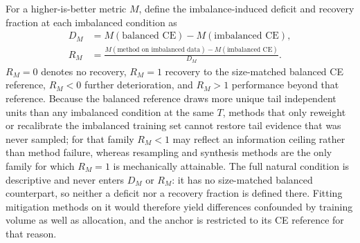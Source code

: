 \documentclass[11pt]{article}
\begin{document}
For a higher-is-better metric $M$, define the imbalance-induced deficit and recovery fraction at each imbalanced condition as
\begin{equation}
  \begin{aligned}
    D_M &= M(\text{balanced CE})-M(\text{imbalanced CE}),\\
    R_M &= \frac{M(\text{method on imbalanced data})
      -M(\text{imbalanced CE})}{D_M}.
  \end{aligned}
  \label{eq:recovery}
\end{equation}
$R_M=0$ denotes no recovery, $R_M=1$ recovery to the size-matched balanced CE reference, $R_M<0$ further deterioration, and $R_M>1$ performance beyond that reference. Because the balanced reference draws more unique tail independent units than any imbalanced condition at the same $T$, methods that only reweight or recalibrate the imbalanced training set cannot restore tail evidence that was never sampled; for that family $R_M<1$ may reflect an information ceiling rather than method failure, whereas resampling and synthesis methods are the only family for which $R_M=1$ is mechanically attainable. The full natural condition is descriptive and never enters $D_M$ or $R_M$: it has no size-matched balanced counterpart, so neither a deficit nor a recovery fraction is defined there. Fitting mitigation methods on it would therefore yield differences confounded by training volume as well as allocation, and the anchor is restricted to its CE reference for that reason.
\end{document}
